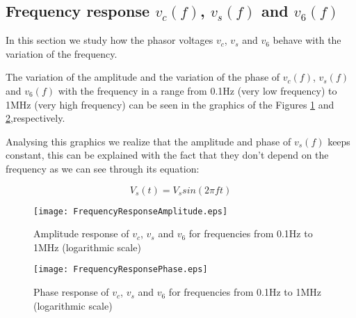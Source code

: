 \subsection{Frequency response $v_c(f)$, $v_s(f)$ and $v_6(f)$}

In this section we study how the phasor voltages $v_c$, $v_s$ and $v_6$ behave with the variation of the frequency. 

The variation of the amplitude and the variation of the phase of $v_c(f)$, $v_s(f)$ and $v_6(f)$ with the frequency in a range from 0.1Hz (very low frequency) to 1MHz (very high frequency) can be seen in the graphics of the Figures \ref{fig:FrequencyResponseAmplitude} and \ref{fig:FrequencyResponsePhase},respectively. 

Analysing this graphics we realize that the amplitude and phase of $v_s(f)$ keeps constant, this can be explained with the fact that they don't depend on the frequency as we can see through its equation:

\begin{equation}
    V_{s}(t) = V_s sin(2 \pi f t)
\end{equation}



\begin{figure}[H] \centering
  \texttt{[image: FrequencyResponseAmplitude.eps]}
  \caption{Amplitude response  of $v_c$, $v_s$ and $v_6$ for frequencies from 0.1Hz to 1MHz (logarithmic scale)}
  \label{fig:FrequencyResponseAmplitude}
\end{figure} 


\begin{figure}[H] \centering
  \texttt{[image: FrequencyResponsePhase.eps]}
  \caption{Phase response of $v_c$, $v_s$ and $v_6$ for frequencies from 0.1Hz to 1MHz (logarithmic scale)}
  \label{fig:FrequencyResponsePhase}
\end{figure} 











